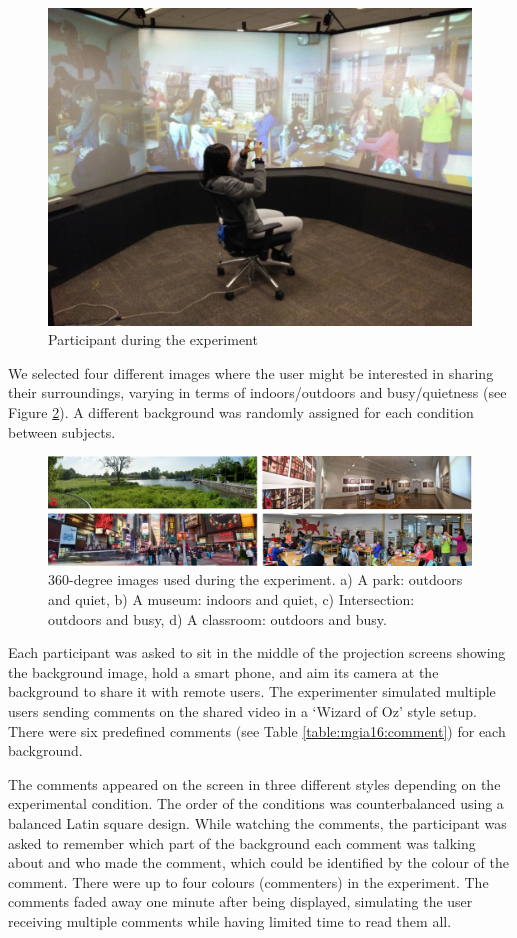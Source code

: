 \begin{figure}[ht]
  \centering
  \includegraphics[width=.6\linewidth]{images/mgia16/participant1}
  \caption{Participant during the experiment}
	\label{fig:mgia16:participant}
\end{figure}

We selected four different images where the user might be interested in sharing their surroundings, varying in terms of indoors/outdoors and busy/quietness (see Figure \ref{fig:mgia16:backgrounds}). A different background was randomly assigned for each condition between subjects. 

\begin{figure}[b]
  \centering
  \includegraphics[width=\linewidth]{images/mgia16/backgrounds-legend.png}
  \caption{360-degree images used during the experiment. a) A park: outdoors and quiet, b) A museum: indoors and quiet, c) Intersection: outdoors and busy, d) A classroom: outdoors and busy.}
	\label{fig:mgia16:backgrounds}
\end{figure}

Each participant was asked to sit in the middle of the projection screens showing the background image, hold a smart phone, and aim its camera at the background to share it with remote users. The experimenter simulated multiple users sending comments on the shared video in a ‘Wizard of Oz' style setup. There were six predefined comments (see Table \ref{table:mgia16:comment}) for each background. 

The comments appeared on the screen in three different styles depending on the experimental condition. The order of the conditions was counterbalanced using a balanced Latin square design. While watching the comments, the participant was asked to remember which part of the background each comment was talking about and who made the comment, which could be identified by the colour of the comment. There were up to four colours (commenters) in the experiment. The comments faded away one minute after being displayed, simulating the user receiving multiple comments while having limited time to read them all.


